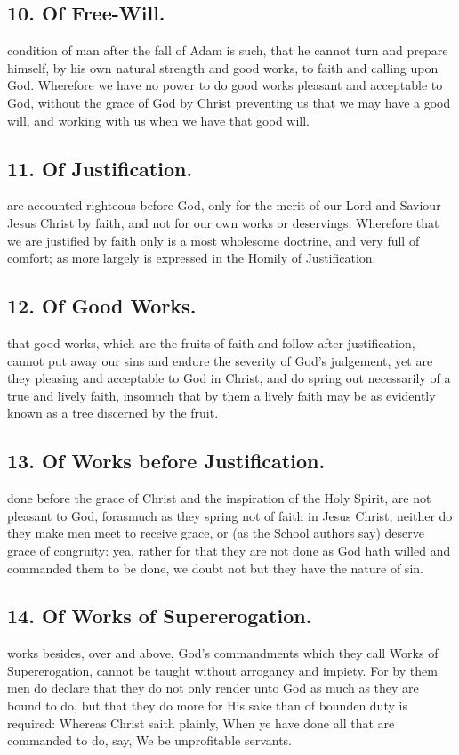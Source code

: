 \subsection{10. Of Free-Will.}
 condition of man after the fall of Adam is such, that he cannot turn and prepare himself, by his own natural strength and good works, to faith and calling upon God. Wherefore we have no power to do good works pleasant and acceptable to God, without the grace of God by Christ preventing us that we may have a good will, and working with us when we have that good will.

\subsection{11. Of Justification.}
 are accounted righteous before God, only for the merit of our Lord and Saviour Jesus Christ by faith, and not for our own works or deservings. Wherefore that we are justified by faith only is a most wholesome doctrine, and very full of comfort; as more largely is expressed in the Homily of Justification.

\subsection{12. Of Good Works.}
 that good works, which are the fruits of faith and follow after justification, cannot put away our sins and endure the severity of God's judgement, yet are they pleasing and acceptable to God in Christ, and do spring out necessarily of a true and lively faith, insomuch that by them a lively faith may be as evidently known as a tree discerned by the fruit.

\subsection{13. Of Works before Justification.}
 done before the grace of Christ and the inspiration of the Holy Spirit, are not pleasant to God, forasmuch as they spring not of faith in Jesus Christ, neither do they make men meet to receive grace, or (as the School authors say) deserve grace of congruity: yea, rather for that they are not done as God hath willed and commanded them to be done, we doubt not but they have the nature of sin.

\subsection{14. Of Works of Supererogation.}
 works besides, over and above, God's commandments which they call Works of Supererogation, cannot be taught without arrogancy and impiety. For by them men do declare that they do not only render unto God as much as they are bound to do, but that they do more for His sake than of bounden duty is required: Whereas Christ saith plainly, When ye have done all that are commanded to do, say, We be unprofitable servants.

